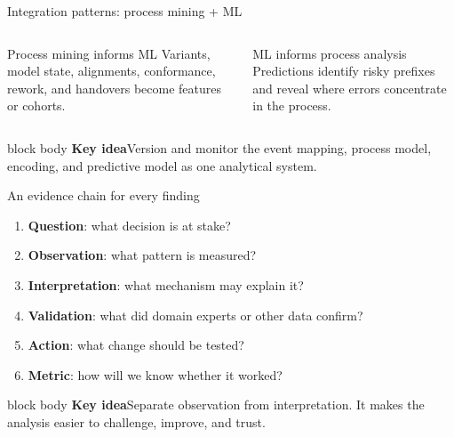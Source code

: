 \documentclass[aspectratio=169,11pt]{beamer}
\newcommand{\keyidea}[1]{%
  \begin{beamercolorbox}[rounded=true,sep=0.65em]{block body}
    \textbf{\color{Teal}Key idea}\quad #1
  \end{beamercolorbox}
}
\begin{document}
\begin{frame}{Integration patterns: process mining + ML}
  \small
  \begin{columns}[T,onlytextwidth]
      \begin{block}{Process mining informs ML}
        Variants, model state, alignments, conformance, rework, and handovers
        become features or cohorts.
      \end{block}
      \begin{block}{ML informs process analysis}
        Predictions identify risky prefixes and reveal where errors concentrate
        in the process.
      \end{block}
      \centering
  \end{columns}
  \vspace{0.1cm}
  \keyidea{Version and monitor the event mapping, process model, encoding, and
  predictive model as one analytical system.}
\end{frame}

\begin{frame}{An evidence chain for every finding}
  \begin{enumerate}
    \item \textbf{Question}: what decision is at stake?
    \item \textbf{Observation}: what pattern is measured?
    \item \textbf{Interpretation}: what mechanism may explain it?
    \item \textbf{Validation}: what did domain experts or other data confirm?
    \item \textbf{Action}: what change should be tested?
    \item \textbf{Metric}: how will we know whether it worked?
  \end{enumerate}
  \vspace{0.35cm}
  \keyidea{Separate observation from interpretation. It makes the analysis easier
  to challenge, improve, and trust.}
\end{frame}
\end{document}
